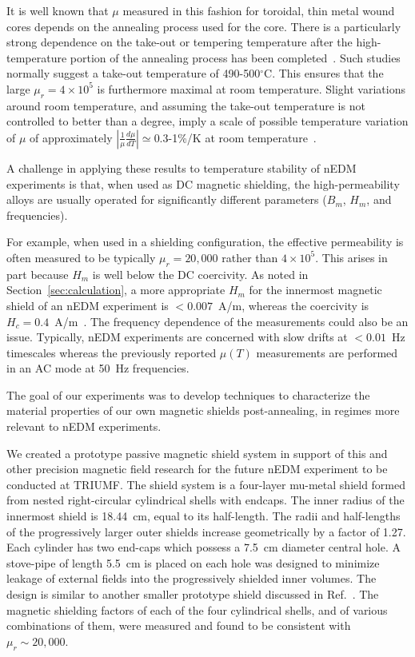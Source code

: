 \documentclass[review,number,sort&compress]{elsarticle}
\begin{document}
It is well known that $\mu$ measured in this fashion for toroidal,
thin metal wound cores depends on the annealing process used for the
core.  There is a particularly strong dependence on the take-out or
tempering temperature after the high-temperature portion of the
annealing process has been
completed~\cite{bib:pfeifer,bib:kruppvdm,bib:couderchon}.  Such
studies normally suggest a take-out temperature of 490-500$^\circ$C.
This ensures that the large $\mu_r=4\times 10^{5}$ is furthermore
maximal at room temperature.  Slight variations around room
temperature, and assuming the take-out temperature is not controlled
to better than a degree, imply a scale of possible temperature
variation of $\mu$ of approximately
$\left|\frac{1}{\mu}\frac{d\mu}{dT}\right|\simeq 0.3$-1\%/K at room
temperature~\cite{bib:couderchon,bib:kruppvdm}.

A challenge in applying these results to temperature stability of nEDM
experiments is that, when used as DC magnetic shielding, the
high-permeability alloys are usually operated for significantly
different parameters ($B_m$, $H_m$, and frequencies).

For example, when used in a shielding configuration, the effective
permeability is often measured to be typically $\mu_r=20,000$ rather
than $4\times 10^5$.  This arises in part because $H_m$ is well below
the DC coercivity.  As noted in Section~\ref{sec:calculation}, a more
appropriate $H_m$ for the innermost magnetic shield of an nEDM
experiment is $<0.007$~A/m, whereas the coercivity is
$H_c=0.4$~A/m~\cite{bib:kruppvdm}.  The frequency dependence of the
measurements could also be an issue.  Typically, nEDM experiments are
concerned with slow drifts at $<0.01$~Hz timescales whereas the
previously reported $\mu(T)$ measurements are performed in an AC mode
at 50~Hz frequencies.


The goal of our experiments was to develop techniques to characterize
the material properties of our own magnetic shields post-annealing, in
regimes more relevant to nEDM experiments.


We created a prototype passive magnetic shield system in support of
this and other precision magnetic field research for the future nEDM
experiment to be conducted at TRIUMF.  The shield system is a
four-layer mu-metal shield formed from nested right-circular
cylindrical shells with endcaps.  The inner radius of the innermost
shield is 18.44~cm, equal to its half-length. The radii and
half-lengths of the progressively larger outer shields increase
geometrically by a factor of 1.27.  Each cylinder has two end-caps
which possess a 7.5~cm diameter central hole.  A stove-pipe of length
5.5~cm is placed on each hole was designed to minimize leakage of
external fields into the progressively shielded inner volumes.  The
design is similar to another smaller prototype shield discussed in
Ref.~\cite{bib:nmorpaper}.  The magnetic shielding factors of each of
the four cylindrical shells, and of various combinations of them, were
measured and found to be consistent with $\mu_r\sim 20,000$.
\end{document}
